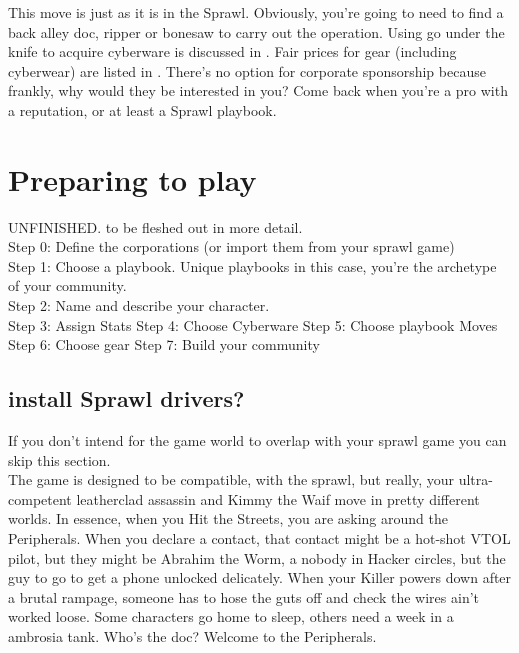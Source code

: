 \documentclass{tufte-book}
\begin{document}
This move is just as it is in the Sprawl. Obviously, you're going to need to find a back alley doc, ripper or bonesaw to carry out the operation. Using go under the knife to acquire cyberware is discussed in . Fair prices for gear (including cyberwear) are listed in .
There's no option for corporate sponsorship because frankly, why would they be interested in you? Come back when you're a pro with a reputation, or at least a Sprawl playbook.

\chapter{Preparing to play} \label{ch:preparing to play}

UNFINISHED. to be fleshed out in more detail.\\

Step 0: Define the corporations (or import them from your sprawl game)\\
Step 1: Choose a playbook. Unique playbooks in this case, you're the archetype of your community.\\
Step 2: Name and describe your character.\\
Step 3: Assign Stats
Step 4: Choose Cyberware
Step 5: Choose playbook Moves
Step 6: Choose gear
Step 7: Build your community

\section{install Sprawl drivers?} \label{sec: the sprawl}

If you don't intend for the game world to overlap with your sprawl game you can skip this section. \\

The game is designed to be compatible, with the sprawl, but really, your ultra-competent leatherclad assassin and Kimmy the Waif move in pretty different worlds. In essence, when you Hit the Streets, you are asking around the Peripherals. When you declare a contact, that contact might be a hot-shot VTOL pilot, but they might be Abrahim the Worm, a nobody in Hacker circles, but the guy to go to get a phone unlocked delicately. When your Killer powers down after a brutal rampage, someone has to hose the guts off and check the wires ain't worked loose. Some characters go home to sleep, others need a week in a ambrosia tank. Who's the doc?
Welcome to the Peripherals. 
\end{document}
